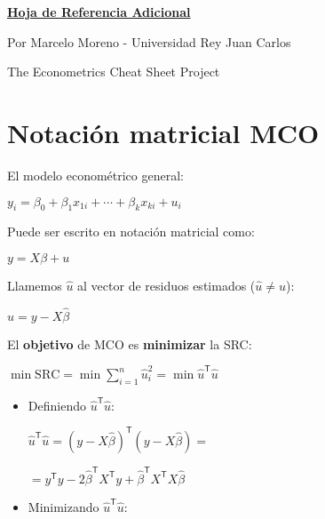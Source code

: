 \documentclass[10pt, a4paper, landscape]{article}
\newcommand{\SSR}{\mathrm{SRC}}
\newcommand{\tr}{\mathsf{T}}
\begin{document}
	\begin{multicols}{3}
		\begin{center}
			\textbf{\LARGE \href{https://github.com/marcelomijas/econometrics-cheatsheet}{Hoja de Referencia Adicional}}
			
			{\footnotesize Por Marcelo Moreno - Universidad Rey Juan Carlos}
			
			{\footnotesize The Econometrics Cheat Sheet Project}
		\end{center}
		
		\section*{Notación matricial MCO}
		
		El modelo econométrico general:
		
		\begin{center}
			$y_{i} = \beta_{0} + \beta_{1} x_{1i} + \cdots + \beta_{k} x_{ki} + u_{i}$
		\end{center}
		
		Puede ser escrito en notación matricial como:
		
		\begin{center}
			$y = X \beta + u$
		\end{center}
		
		Llamemos $\hat{u}$ al vector de residuos estimados ($\hat{u} \neq u$):
		
		\begin{center}
			$\hat{u} = y - X \hat{\beta}$
		\end{center}
		
		El \textbf{objetivo} de MCO es \textbf{minimizar} la SRC:
		
		\begin{center}
			$\min \SSR = \min \sum_{i=1}^{n} \hat{u}_{i}^{2} = \min \hat{u}^{\tr} \hat{u}$
		\end{center}
		
		\begin{itemize}[leftmargin=*]
			\item Definiendo $\hat{u}^{\tr} \hat{u}$:
			
			\begin{center}
				$\hat{u}^{\tr} \hat{u} = (y - X \hat{\beta})^{\tr} (y - X \hat{\beta}) =$
				
				$= y^{\tr} y - 2 \hat{\beta}^{\tr} X^{\tr} y + \hat{\beta}^{\tr} X^{\tr} X \hat{\beta}$
			\end{center}
			
			\item Minimizando $\hat{u}^{\tr} \hat{u}$:
			

\end{itemize}
\end{multicols}
\end{document}
